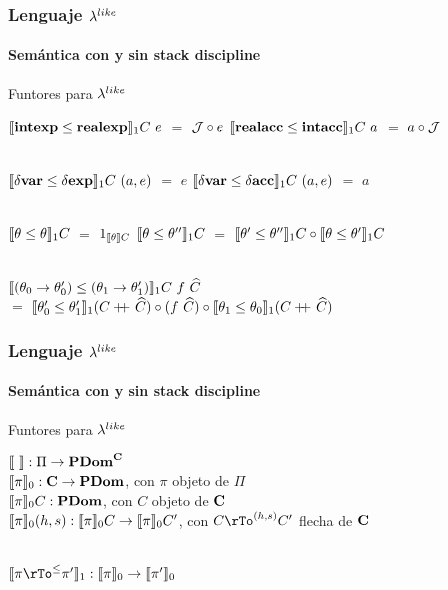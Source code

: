 \documentclass{beamer}
\begin{document}
\begin{frame}
\frametitle{Lenguaje $\lambda^{like}$}
\framesubtitle{Semántica con y sin stack discipline}

\begin{block}{Funtores para $\lambda^{like}$}

$\semBrcks{\intexp \leq \realexp}_1 C \ e$ $=$ $\mathcal{J} \circ e$
\quad 
$\llbracket \textbf{realacc} \leq \textbf{intacc} \rrbracket_1 C \ a$ $=$ $a \circ \mathcal{J}$\\

\

$\semBrcks{\deltavar \leq \deltaexp}_1 C \ (a,e)$ $=$ $e$
\quad \quad \quad 
$\semBrcks{\deltavar \leq \deltaacc}_1 C \ (a,e)$ $=$ $a$\\

\


$\llbracket \theta \leq \theta \rrbracket_1 C$ $=$ $1_{\llbracket \theta \rrbracket C}$
\quad \quad \quad \quad 
$\llbracket \theta \leq \theta'' \rrbracket_1 C$ $=$ 
					$\llbracket \theta' \leq \theta'' \rrbracket_1 C \circ \llbracket \theta \leq \theta' \rrbracket_1 C$\\

\

$\semBrcks{(\theta_0 \rightarrow \theta'_0) \leq (\theta_1 \rightarrow \theta'_1)}_1 C \ f \ \widehat{C}$ \\
\quad \quad \quad \quad \quad 
			$=$ 
			$\llbracket \theta'_0 \leq \theta'_1 \rrbracket_1 (C +\kern-1.3ex+\kern0.8ex \widehat{C}) 
				\circ 
			(f \ \widehat{C}) 
				\circ 
			\llbracket \theta_1 \leq \theta_0 \rrbracket_1 (C +\kern-1.3ex+\kern0.8ex \widehat{C}) 
			$\\

\end{block}

\end{frame}

\begin{frame}
\frametitle{Lenguaje $\lambda^{like}$}
\framesubtitle{Semántica con y sin stack discipline}

\begin{block}{Funtores para $\lambda^{like}$}

$\llbracket  \  \rrbracket : \Pi \rightarrow \textbf{PDom}^{\textbf{C}}$\\
$\llbracket \pi \rrbracket_{0} : \textbf{C} \rightarrow \textbf{PDom}$, con $\pi$ objeto de $\Pi$\\
$\llbracket \pi \rrbracket_{0}C : \textbf{PDom}$, con $C$ objeto de $\textbf{C}$\\
$\llbracket \pi \rrbracket_{0}(h,s) : \llbracket \pi \rrbracket_{0}C \rightarrow \llbracket \pi \rrbracket_{0}C'$, con 
$C \rTo^{(h,s)} C'$ flecha de $\textbf{C}$\\

\

$\semBrcks{\pi \rTo^{\leq} \pi'}_{1} : 
	\semBrcks{\pi}_{0} \rightarrow \semBrcks{\pi'}_{0}$\\

\end{block}

\end{frame}
\end{document}
